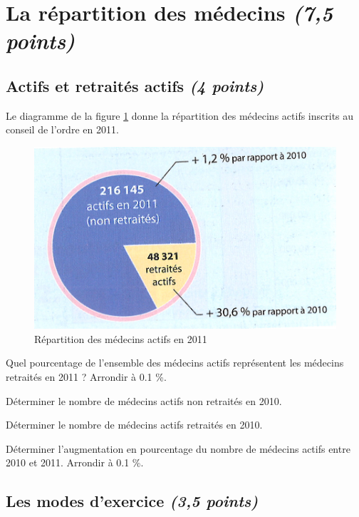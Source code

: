 \section{La répartition des médecins \textit{(7,5 points)}}

\subsection{Actifs et retraités actifs \textit{(4 points)}}

Le diagramme de la figure \ref{fig:repartition} donne la répartition des médecins actifs inscrits au conseil de l'ordre en 2011.

\begin{figure}[h]
	\begin{center}
		\includegraphics[scale=1]{repartition}
		\caption{Répartition des médecins actifs en 2011}
		\label{fig:repartition}
	\end{center}
\end{figure}


\begin{questions}
	\question[1] Quel pourcentage de l'ensemble des médecins actifs représentent les médecins retraités en 2011 ? Arrondir à \num{0.1} \%.
	
	\question[1] Déterminer le nombre de médecins actifs non retraités en 2010.
	
	\question[1] Déterminer le nombre de médecins actifs retraités en 2010.
	
	\question[1] Déterminer l'augmentation en pourcentage du nombre de médecins actifs entre 2010 et 2011. Arrondir à \num{0.1} \%.
	
\end{questions}

\subsection{Les modes d'exercice \textit{(3,5 points)}}

